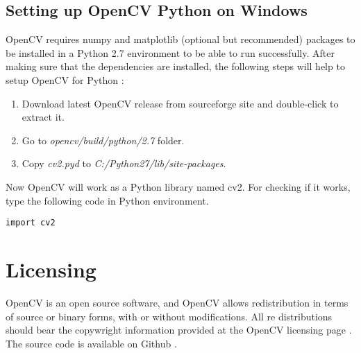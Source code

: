 \documentclass[9pt,twocolumn,twoside]{../../styles/osajnl}
\begin{document}
\subsection{Setting up OpenCV Python on Windows}
OpenCV requires numpy and matplotlib (optional but recommended) packages to be installed in a Python 2.7 environment to be able to run successfully. After making sure that the dependencies are installed, the following steps will help to setup OpenCV for Python \cite{www-opencv-python}:

\begin{enumerate}
    \item Download latest OpenCV release from sourceforge site \cite{www-opencv-sf} and double-click to extract it.
    \item Go to \textit{opencv/build/python/2.7} folder.
    \item Copy \textit{cv2.pyd} to \textit{C:/Python27/lib/site-packages}. 
\end{enumerate}
Now OpenCV will work as a Python library named cv2. For checking if it works, type the following code in Python environment.
\begin{Verbatim}
import cv2
\end{Verbatim}

\section{Licensing}
OpenCV is an open source software, and OpenCV allows redistribution in terms of source or binary forms, with or without modifications. All re distributions should bear the copywright information provided at the OpenCV licensing page \cite{www-opencv-license}. The source code is available on Github \cite{www-git-opencv}.
\end{document}
